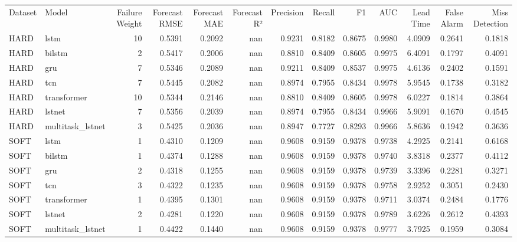 \begin{tabular}{llrrrrrrrrrrr}
Dataset & Model & Failure Weight & Forecast RMSE & Forecast MAE & Forecast R² & Precision & Recall & F1 & AUC & Lead Time & False Alarm & Miss Detection \\
HARD & lstm & 10 & 0.5391 & 0.2092 & nan & 0.9231 & 0.8182 & 0.8675 & 0.9980 & 4.0909 & 0.2641 & 0.1818 \\
HARD & bilstm & 2 & 0.5417 & 0.2006 & nan & 0.8810 & 0.8409 & 0.8605 & 0.9975 & 6.4091 & 0.1797 & 0.4091 \\
HARD & gru & 7 & 0.5346 & 0.2089 & nan & 0.9211 & 0.8409 & 0.8537 & 0.9975 & 4.6136 & 0.2402 & 0.1591 \\
HARD & tcn & 7 & 0.5445 & 0.2082 & nan & 0.8974 & 0.7955 & 0.8434 & 0.9978 & 5.9545 & 0.1738 & 0.3182 \\
HARD & transformer & 10 & 0.5344 & 0.2146 & nan & 0.8810 & 0.8409 & 0.8605 & 0.9978 & 6.0227 & 0.1814 & 0.3864 \\
HARD & lstnet & 7 & 0.5356 & 0.2039 & nan & 0.8974 & 0.7955 & 0.8434 & 0.9966 & 5.9091 & 0.1670 & 0.4545 \\
HARD & multitask_lstnet & 3 & 0.5425 & 0.2036 & nan & 0.8947 & 0.7727 & 0.8293 & 0.9966 & 5.8636 & 0.1942 & 0.3636 \\
SOFT & lstm & 1 & 0.4310 & 0.1209 & nan & 0.9608 & 0.9159 & 0.9378 & 0.9738 & 4.2925 & 0.2141 & 0.6168 \\
SOFT & bilstm & 1 & 0.4374 & 0.1288 & nan & 0.9608 & 0.9159 & 0.9378 & 0.9740 & 3.8318 & 0.2377 & 0.4112 \\
SOFT & gru & 2 & 0.4318 & 0.1255 & nan & 0.9608 & 0.9159 & 0.9378 & 0.9739 & 3.3396 & 0.2281 & 0.3271 \\
SOFT & tcn & 3 & 0.4322 & 0.1235 & nan & 0.9608 & 0.9159 & 0.9378 & 0.9758 & 2.9252 & 0.3051 & 0.2430 \\
SOFT & transformer & 1 & 0.4395 & 0.1301 & nan & 0.9608 & 0.9159 & 0.9378 & 0.9711 & 3.0374 & 0.2484 & 0.1776 \\
SOFT & lstnet & 2 & 0.4281 & 0.1220 & nan & 0.9608 & 0.9159 & 0.9378 & 0.9789 & 3.6226 & 0.2612 & 0.4393 \\
SOFT & multitask_lstnet & 1 & 0.4422 & 0.1440 & nan & 0.9608 & 0.9159 & 0.9378 & 0.9777 & 3.7925 & 0.1959 & 0.3084 \\
\end{tabular}
